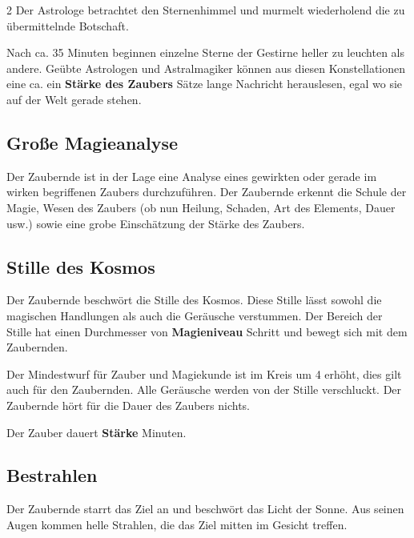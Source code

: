 \begin{multicols*}{2}
Der Astrologe betrachtet den Sternenhimmel und murmelt wiederholend die zu übermittelnde Botschaft.

Nach ca. 35 Minuten beginnen einzelne Sterne der Gestirne heller zu leuchten als andere. Geübte Astrologen und Astralmagiker können aus diesen Konstellationen eine ca. ein \textbf{Stärke des Zaubers} Sätze lange Nachricht herauslesen, egal wo sie auf der Welt gerade stehen.



\subsection{Große Magieanalyse}

Der Zaubernde ist in der Lage eine Analyse eines gewirkten oder gerade im wirken begriffenen Zaubers durchzuführen. Der Zaubernde erkennt die Schule der Magie, Wesen des Zaubers (ob nun Heilung, Schaden, Art des Elements, Dauer usw.) sowie eine grobe Einschätzung der Stärke des Zaubers.



\subsection{Stille des Kosmos}

Der Zaubernde beschwört die Stille des Kosmos. Diese Stille lässt sowohl die magischen Handlungen als auch die Geräusche verstummen. Der Bereich der Stille hat einen Durchmesser von \textbf{Magieniveau} Schritt und bewegt sich mit dem Zaubernden.

Der Mindestwurf für Zauber und Magiekunde ist im Kreis um 4 erhöht, dies gilt auch für den Zaubernden. Alle Geräusche werden von der Stille verschluckt. Der Zaubernde hört für die Dauer des Zaubers nichts.

Der Zauber dauert \textbf{Stärke} Minuten.



\subsection{Bestrahlen}

Der Zaubernde starrt das Ziel an und beschwört das Licht der Sonne. Aus seinen Augen kommen helle Strahlen, die das Ziel mitten im Gesicht treffen.


\end{multicols*}
